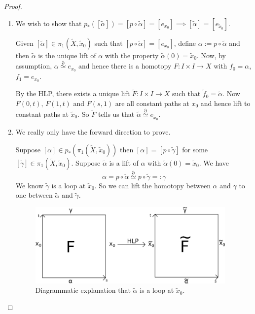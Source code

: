 \documentclass[11pt]{article}
\newcommand{\defeq}{:=}
\newcommand{\eqdef}{=:}
\newcommand{\homrel}{\stackrel{\partial}{\simeq}}
\begin{document}
\begin{proof}
\begin{enumerate}
	\item We wish to show that $p_\ast([\widetilde{\alpha}])=[p\circ \widetilde{\alpha}]=[e_{x_0}]\implies [\widetilde{\alpha}]=[e_{\widetilde{x}_0}]$.

	Given $[\widetilde{\alpha}]\in\pi_1(\widetilde{X}, \widetilde{x}_0)$ such that $[p\circ\widetilde{\alpha}]=[e_{x_0}]$, define $\alpha\defeq p\circ\widetilde{\alpha}$ and then $\widetilde{\alpha}$ is the unique lift of $\alpha$ with the property $\widetilde{\alpha}(0)=\widetilde{x}_0$. 
	Now, by assumption, $\alpha\homrel e_{x_0}$ and hence there is a homotopy $F:I\times I \to X$ with $f_0=\alpha$, $f_1=e_{x_0}$.

	By the HLP, there exists a unique lift $\widetilde{F}:I\times I \to X$ such that $\widetilde{f}_0=\widetilde{\alpha}$.
	Now $F(0, t)$, $F(1, t)$ and $F(s, 1)$ are all constant paths at $x_0$ and hence lift to constant paths at $\widetilde{x}_0$.
	So $\widetilde{F}$ tells us that $\widetilde{\alpha}\homrel e_{\widetilde{x}_0}$.

	\item We really only have the forward direction to prove.

		Suppose $[\alpha]\in p_\ast(\pi_1(\widetilde{X}, \widetilde{x}_0))$ then $[\alpha]=[p\circ \widetilde{\gamma}]$ for some $[\widetilde{\gamma}]\in\pi_1(\widetilde{X}, \widetilde{x}_0)$.
		Suppose $\widetilde{\alpha}$ is a lift of $\alpha$ with $\widetilde{\alpha}(0)=\widetilde{x}_0$.
		We have
		\[
			\alpha = p\circ \widetilde{\alpha}\homrel p\circ\widetilde{\gamma}\eqdef\gamma
		\]
		We know $\widetilde{\gamma}$ is a loop at $\widetilde{x}_0$.
		So we can lift the homotopy between $\alpha$ and $\gamma$ to one between $\widetilde{\alpha}$ and $\widetilde{\gamma}$.
		\begin{figure}[ht]
			\centering
			\includegraphics[width=4in]{HLPdiagram_1.png}
			\caption{Diagrammatic explanation that $\widetilde{\alpha}$ is a loop at $\widetilde{x}_0$.}
		\end{figure}
\end{enumerate}
\end{proof}
\end{document}
